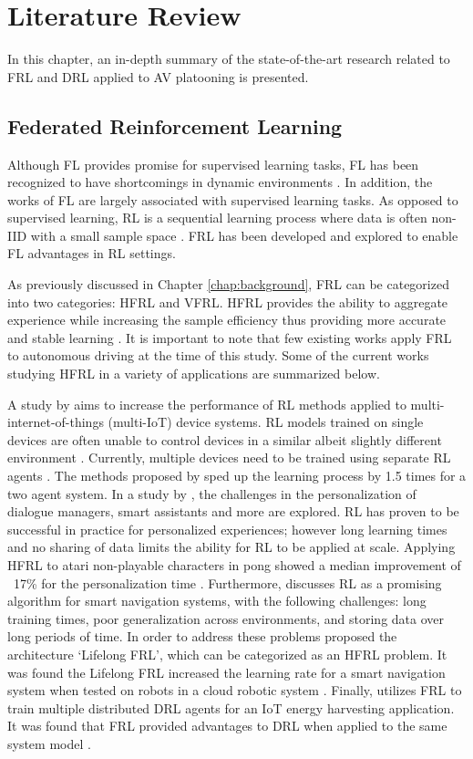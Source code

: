 \chapter{Literature Review} \label{chap:litreview}
In this chapter, an in-depth summary of the state-of-the-art research related to
FRL and DRL applied to AV platooning is presented.

\section{Federated Reinforcement Learning}
Although FL provides promise for supervised learning tasks, FL has been recognized to have
shortcomings in dynamic environments \cite{Li2020a}.   In addition, the works of FL
are largely associated with supervised learning tasks. As opposed to supervised learning,
RL is a sequential learning process where data is often non-IID with a small sample space
\cite{Zhuo2019, sutton2018reinforcement}. FRL has been developed and explored to enable FL advantages
in RL settings.

As previously discussed in Chapter \ref{chap:background}, FRL can be categorized into two categories: HFRL and VFRL.
HFRL provides the ability to aggregate experience while increasing the sample efficiency thus
providing more accurate and stable learning  \cite{IntelAI19}.
It is important to note that few existing works apply
FRL to autonomous driving at the time of this study.  Some of the current works studying
HFRL in a variety of applications are summarized below.

A study by \cite{Lim2020} aims to increase the performance of RL methods applied to
multi-internet-of-things (multi-IoT) device systems.  RL models trained on single devices are often unable to control
devices in a similar albeit slightly different environment \cite{Lim2020}.  Currently,
multiple devices need to be trained using separate RL agents \cite{Lim2020}. The methods
proposed by \cite{Lim2020} sped up the learning process by 1.5 times for a two agent system.
In a study by \cite{Nadiger2019}, the challenges in the personalization of dialogue
managers, smart assistants and more are explored.  RL has proven to be successful in
practice for personalized experiences; however long learning times and no sharing of data
limits the ability for RL to be applied at scale.  Applying HFRL to atari non-playable
characters in pong showed a median improvement of ~17\% for the personalization time
\cite{Nadiger2019}. Furthermore, \cite{Liu2019b} discusses RL as a promising algorithm for
smart navigation systems, with the following challenges: long training times, poor
generalization across environments, and storing data over long periods of time.  In order
to address these problems \cite{Liu2019b} proposed the architecture `Lifelong FRL',
which can be categorized as an HFRL problem.  It was found the Lifelong FRL increased
the learning rate for a smart navigation system when tested on robots in a cloud
robotic system \cite{Liu2019b}. Finally, \cite{Ren2019} utilizes FRL to train multiple distributed
DRL agents for an IoT energy harvesting application.  It was found that FRL
provided advantages to DRL when applied to the same system model \cite{Ren2019}.



